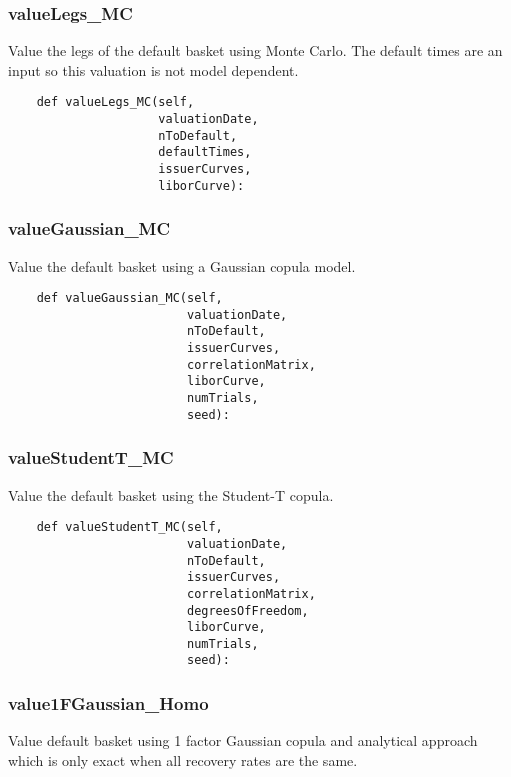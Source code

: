 \documentclass[twoside,11pt]{book}
\begin{document}
\subsubsection*{{\bf valueLegs\_MC}}
Value the legs of the default basket using Monte Carlo. The default times are an input so this valuation is not model dependent.  

\begin{lstlisting}
    def valueLegs_MC(self,
                     valuationDate,
                     nToDefault,
                     defaultTimes,
                     issuerCurves,
                     liborCurve):
\end{lstlisting}

\subsubsection*{{\bf valueGaussian\_MC}}
Value the default basket using a Gaussian copula model.  

\begin{lstlisting}
    def valueGaussian_MC(self,
                         valuationDate,
                         nToDefault,
                         issuerCurves,
                         correlationMatrix,
                         liborCurve,
                         numTrials,
                         seed):
\end{lstlisting}

\subsubsection*{{\bf valueStudentT\_MC}}
Value the default basket using the Student-T copula.  

\begin{lstlisting}
    def valueStudentT_MC(self,
                         valuationDate,
                         nToDefault,
                         issuerCurves,
                         correlationMatrix,
                         degreesOfFreedom,
                         liborCurve,
                         numTrials,
                         seed):
\end{lstlisting}

\subsubsection*{{\bf value1FGaussian\_Homo}}
Value default basket using 1 factor Gaussian copula and analytical approach which is only exact when all recovery rates are the same.  
\end{document}
